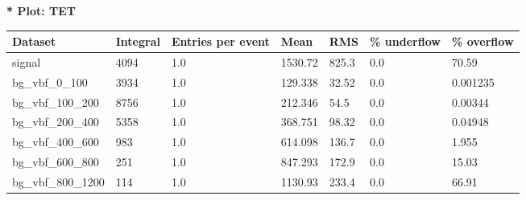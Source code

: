 \documentclass[a4paper, 10pt]{article}
\begin{document}
\textbf{* Plot: TET}\\
   \begin{table}[H]
  \begin{center}
    \begin{tabular}{|m{23.0mm}|m{23.0mm}|m{18.0mm}|m{19.0mm}|m{19.0mm}|m{19.0mm}|m{19.0mm}|}
      \hline
      {\cellcolor{yellow}         Dataset}& {\cellcolor{yellow}         Integral}& {\cellcolor{yellow}         Entries per event}& {\cellcolor{yellow}         Mean}& {\cellcolor{yellow}         RMS}& {\cellcolor{yellow}         \% underflow}& {\cellcolor{yellow}         \% overflow}\\
      \hline
      {\cellcolor{white}         signal}& {\cellcolor{white}         4094}& {\cellcolor{white}         1.0}& {\cellcolor{white}         1530.72}& {\cellcolor{white}         825.3}& {\cellcolor{red}         0.0}& {\cellcolor{red}         70.59}\\
      \hline
      {\cellcolor{white}         bg\_vbf\_0\_100}& {\cellcolor{white}         3934}& {\cellcolor{white}         1.0}& {\cellcolor{white}         129.338}& {\cellcolor{white}         32.52}& {\cellcolor{green}         0.0}& {\cellcolor{green}         0.001235}\\
      \hline
      {\cellcolor{white}         bg\_vbf\_100\_200}& {\cellcolor{white}         8756}& {\cellcolor{white}         1.0}& {\cellcolor{white}         212.346}& {\cellcolor{white}         54.5}& {\cellcolor{green}         0.0}& {\cellcolor{green}         0.00344}\\
      \hline
      {\cellcolor{white}         bg\_vbf\_200\_400}& {\cellcolor{white}         5358}& {\cellcolor{white}         1.0}& {\cellcolor{white}         368.751}& {\cellcolor{white}         98.32}& {\cellcolor{green}         0.0}& {\cellcolor{green}         0.04948}\\
      \hline
      {\cellcolor{white}         bg\_vbf\_400\_600}& {\cellcolor{white}         983}& {\cellcolor{white}         1.0}& {\cellcolor{white}         614.098}& {\cellcolor{white}         136.7}& {\cellcolor{green}         0.0}& {\cellcolor{green}         1.955}\\
      \hline
      {\cellcolor{white}         bg\_vbf\_600\_800}& {\cellcolor{white}         251}& {\cellcolor{white}         1.0}& {\cellcolor{white}         847.293}& {\cellcolor{white}         172.9}& {\cellcolor{red}         0.0}& {\cellcolor{red}         15.03}\\
      \hline
      {\cellcolor{white}         bg\_vbf\_800\_1200}& {\cellcolor{white}         114}& {\cellcolor{white}         1.0}& {\cellcolor{white}         1130.93}& {\cellcolor{white}         233.4}& {\cellcolor{red}         0.0}& {\cellcolor{red}         66.91}\\

\end{tabular}
\end{center}
\end{table}
\end{document}
